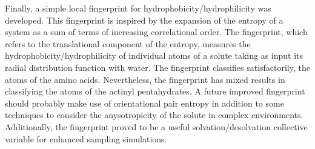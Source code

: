 Finally, a simple local fingerprint for 
hydrophobicity/hydrophilicity was developed. This fingerprint is inspired by the expansion of 
the 
entropy of a system as a sum of terms of increasing correlational 
order.\cite{nettleton1958expression,baranyai1989direct} The fingerprint, which refers to the 
translational component of the entropy, 
measures the hydrophobicity/hydrophilicity of individual atoms of a solute taking as input its 
radial distribution function with water. The fingerprint classifies satisfactorily, the atoms of 
the amino acids. Nevertheless, the fingerprint has mixed results in classifying the atoms of 
the actinyl pentahydrates. A future improved fingerprint should probably make use of orientational 
pair entropy in addition to some techniques to consider the anysotropicity of the solute in 
complex 
environments. Additionally, the fingerprint proved to be a useful solvation/desolvation 
collective variable for enhanced sampling simulations. 


